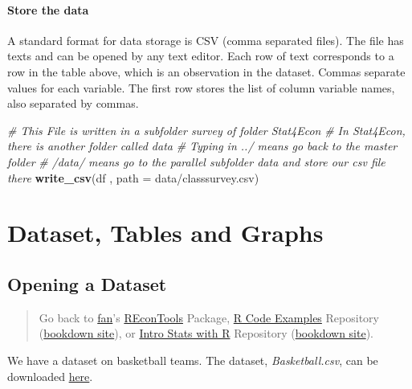 \documentclass[
]{book}
\newenvironment{Shaded}{\begin{snugshade}}{\end{snugshade}}
\newcommand{\CommentTok}[1]{\textcolor[rgb]{0.56,0.35,0.01}{\textit{#1}}}
\newcommand{\DataTypeTok}[1]{\textcolor[rgb]{0.13,0.29,0.53}{#1}}
\newcommand{\KeywordTok}[1]{\textcolor[rgb]{0.13,0.29,0.53}{\textbf{#1}}}
\newcommand{\NormalTok}[1]{#1}
\newcommand{\StringTok}[1]{\textcolor[rgb]{0.31,0.60,0.02}{#1}}
\begin{document}
\hypertarget{store-the-data}{%
\subsubsection{Store the data}\label{store-the-data}}

A standard format for data storage is CSV (comma separated files). The file has texts and can be opened by any text editor. Each row of text corresponds to a row in the table above, which is an observation in the dataset. Commas separate values for each variable. The first row stores the list of column variable names, also separated by commas.

\begin{Shaded}
\begin{Highlighting}[]
\CommentTok{\# This File is written in a subfolder survey of folder Stat4Econ}
\CommentTok{\# In Stat4Econ, there is another folder called data}
\CommentTok{\# Typing in ../ means go back to the master folder}
\CommentTok{\# /data/ means go to the parallel subfolder data and store our csv file there}
\KeywordTok{write\_csv}\NormalTok{(df , }\DataTypeTok{path =} \StringTok{\textquotesingle{}data/classsurvey.csv\textquotesingle{}}\NormalTok{)}
\end{Highlighting}
\end{Shaded}

\hypertarget{dataset-tables-and-graphs}{%
\chapter{Dataset, Tables and Graphs}\label{dataset-tables-and-graphs}}

\hypertarget{opening-a-dataset}{%
\section{Opening a Dataset}\label{opening-a-dataset}}

\begin{quote}
Go back to \href{http://fanwangecon.github.io/}{fan}'s \href{https://fanwangecon.github.io/REconTools/}{REconTools} Package, \href{https://fanwangecon.github.io/R4Econ/}{R Code Examples} Repository (\href{https://fanwangecon.github.io/R4Econ/bookdown}{bookdown site}), or \href{https://fanwangecon.github.io/Stat4Econ/}{Intro Stats with R} Repository (\href{https://fanwangecon.github.io/Stat4Econ/bookdown}{bookdown site}).
\end{quote}

We have a dataset on basketball teams. The dataset, \emph{Basketball.csv}, can be downloaded \href{https://github.com/FanWangEcon/Stat4Econ/tree/master/data/Basketball.csv}{here}.
\end{document}
